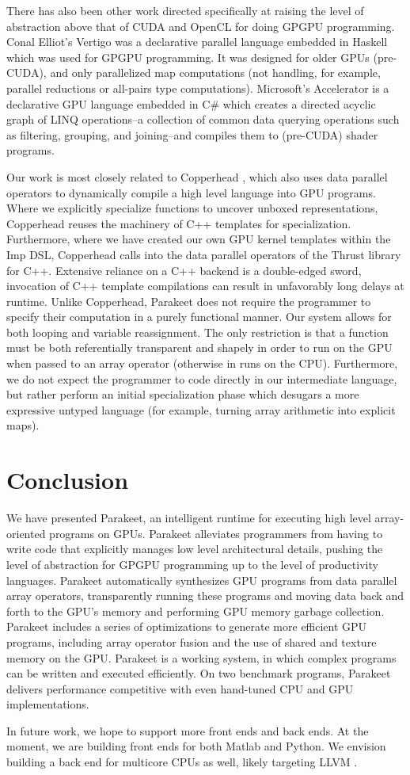 \documentclass[preprint]{sigplanconf}
\begin{document}
There has also been other work directed specifically at raising the level of
abstraction above that of CUDA and OpenCL for doing GPGPU programming.  Conal
Elliot's Vertigo \cite{Elli04} was a declarative parallel language embedded in
Haskell which was used for GPGPU programming.  It was designed for older GPUs
(pre-CUDA), and only parallelized map computations (not handling, for example,
parallel reductions or all-pairs type computations).  Microsoft's Accelerator
\cite{Tard06} is a declarative GPU language embedded in C\# which creates a
directed acyclic graph of LINQ operations--a collection of common data querying
operations such as filtering, grouping, and joining--and compiles them to
(pre-CUDA) shader programs.  

Our work is most closely related to Copperhead \cite{Cata10}, which also uses data parallel
operators to dynamically compile a high level language into GPU programs. Where we explicitly
specialize functions to uncover unboxed representations, Copperhead reuses the machinery 
of C++ templates for specialization. Furthermore, where we have created our own GPU kernel 
templates within the Imp DSL, Copperhead calls into the data parallel operators of the Thrust
library for C++. Extensive reliance on a C++ backend is a double-edged sword, invocation of
C++ template compilations can result in unfavorably long delays at runtime. Unlike Copperhead,
Parakeet does not require the programmer to specify their computation in a purely functional manner.
Our system allows for both looping and variable reassignment. The only restriction is that a function
must be both referentially transparent and shapely in order to run on the GPU when passed to an array
operator (otherwise in runs on the CPU). Furthermore, we do not expect the programmer to code directly
in our intermediate language, but rather perform an initial specialization phase which desugars
a more expressive untyped language (for example, turning array arithmetic into explicit maps). 
\section{Conclusion}
\label{Conclusion}

We have presented Parakeet, an intelligent runtime for executing high level
array-oriented programs on GPUs.  Parakeet alleviates programmers from having
to write code that explicitly manages low level architectural details, pushing
the level of abstraction for GPGPU programming up to the level of productivity
languages.  Parakeet automatically synthesizes GPU programs from data parallel
array operators, transparently running these programs and moving data back and
forth to the GPU's memory and performing GPU memory garbage collection.
Parakeet includes a series of optimizations to generate more efficient GPU
programs, including array operator fusion and the use of shared and texture
memory on the GPU.  Parakeet is a working system, in which complex programs can
be written and executed efficiently.  On two benchmark programs, Parakeet
delivers performance competitive with even hand-tuned CPU and GPU
implementations.

In future work, we hope to support more front ends and back ends.  At the
moment, we are building front ends for both Matlab and Python.  We envision
building a back end for multicore CPUs as well, likely targeting LLVM
\cite{Latt02}.


{}
\end{document}
